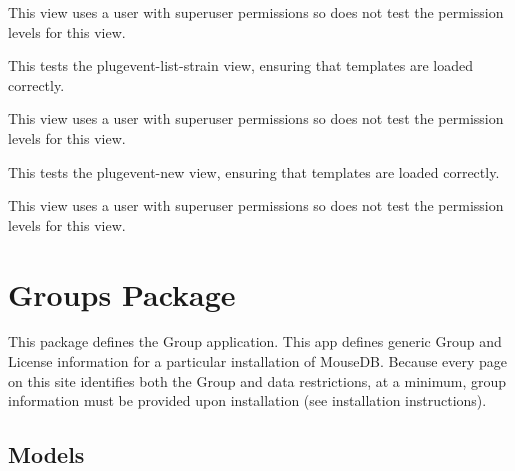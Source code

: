 \documentclass[letterpaper,10pt,english]{sphinxmanual}
\begin{document}
\begin{fulllineitems}
\begin{fulllineitems}
This view uses a user with superuser permissions so does not test the permission levels for this view.

\end{fulllineitems}


\begin{fulllineitems}
\label{api:mousedb.timed_mating.tests.Timed_MatingViewTests.test_plugevent_list_strain}
This tests the plugevent-list-strain view, ensuring that templates are loaded correctly.

This view uses a user with superuser permissions so does not test the permission levels for this view.

\end{fulllineitems}


\begin{fulllineitems}
\label{api:mousedb.timed_mating.tests.Timed_MatingViewTests.test_plugevent_new}
This tests the plugevent-new view, ensuring that templates are loaded correctly.

This view uses a user with superuser permissions so does not test the permission levels for this view.

\end{fulllineitems}


\end{fulllineitems}



\section{Groups Package}
\label{api:groups-package}\label{api:module-mousedb.groups}
This package defines the Group application.
This app defines generic Group and License information for a particular installation of MouseDB.  
Because every page on this site identifies both the Group and data restrictions, at a minimum, group information must be provided upon installation (see installation instructions).


\subsection{Models}
\label{api:id15}\label{api:module-mousedb.groups.models}
\end{document}
